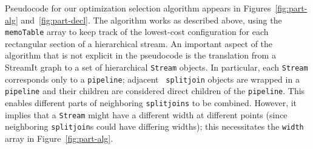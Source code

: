 Pseudocode for our optimization selection algorithm appears in
Figures~\ref{fig:part-alg} and~\ref{fig:part-decl}.  The algorithm
works as described above, using the {\tt memoTable} array to keep
track of the lowest-cost configuration for each rectangular section of
a hierarchical stream.  An important aspect of the algorithm that is
not explicit in the pseudocode is the translation from a StreamIt
graph to a set of hierarchical {\tt Stream} objects.  In particular,
each {\tt Stream} corresponds only to a {\tt pipeline}; adjacent {\tt
splitjoin} objects are wrapped in a {\tt pipeline} and their children
are considered direct children of the {\tt pipeline}.  This enables
different parts of neighboring {\tt splitjoins} to be combined.
However, it implies that a {\tt Stream} might have a different width
at different points (since neighboring {\tt splitjoin}s could have
differing widths); this necessitates the {\tt width} array in
Figure~\ref{fig:part-alg}.

